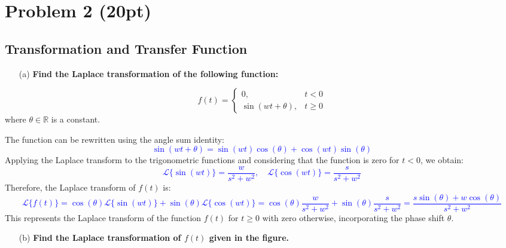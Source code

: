 \documentclass{article}
\begin{document}
\newpage
\section*{Problem 2 (20pt)}
\subsection*{Transformation and Transfer Function}
\begin{enumerate}
	\item[(a)] \textbf{Find the Laplace transformation of the following function:}
\end{enumerate}   
\[
	f(t) = 
	\begin{cases} 
		0,                 & t < 0    \\
		\sin(wt + \theta), & t \geq 0 
	\end{cases}
\]
where \( \theta \in \mathbb{R} \) is a constant.

\noindent The function can be rewritten using the angle sum identity:
\textcolor{blue}{\[
	\sin(wt + \theta) = \sin(wt)\cos(\theta) + \cos(wt)\sin(\theta)
\]}
Applying the Laplace transform to the trigonometric functions and considering that the function is zero for \( t < 0 \), we obtain:
\textcolor{blue}{\[
	\mathcal{L}\{\sin(wt)\} = \frac{w}{s^2 + w^2}, \quad \mathcal{L}\{\cos(wt)\} = \frac{s}{s^2 + w^2}
\]}
Therefore, the Laplace transform of \( f(t) \) is:
\textcolor{blue}{\[
	\boxed{\mathcal{L}\{f(t)\} = \cos(\theta) \mathcal{L}\{\sin(wt)\} + \sin(\theta) \mathcal{L}\{\cos(wt)\}
		= \cos(\theta) \frac{w}{s^2 + w^2} + \sin(\theta) \frac{s}{s^2 + w^2}
		= \frac{s \sin(\theta) + w \cos(\theta)}{s^2 + w^2}}
\]}
This represents the Laplace transform of the function \( f(t) \) for \( t \geq 0 \) with zero otherwise, incorporating the phase shift \( \theta \).
\newpage
\begin{enumerate}
	\item[(b)] \textbf{Find the Laplace transformation of $f(t)$ given in the figure.}
\end{enumerate}
	      
\end{document}
